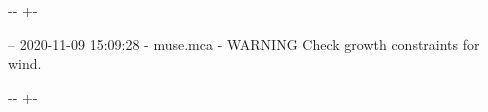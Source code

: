 \documentclass[letterpaper,10pt,english]{sphinxmanual}
\newlength\nbsphinxcodecellspacing
\begin{document}
{

\kern-\sphinxverbatimsmallskipamount\kern-\baselineskip
\kern+\FrameHeightAdjust\kern-\fboxrule
\vspace{\nbsphinxcodecellspacing}

\begin{sphinxVerbatim}[commandchars=\\\{\}]
-- 2020-11-09 15:09:28 - muse.mca - WARNING
Check growth constraints for wind.

\end{sphinxVerbatim}
}

{

\kern-\sphinxverbatimsmallskipamount\kern-\baselineskip
\kern+\FrameHeightAdjust\kern-\fboxrule
\vspace{\nbsphinxcodecellspacing}

}
\end{document}
